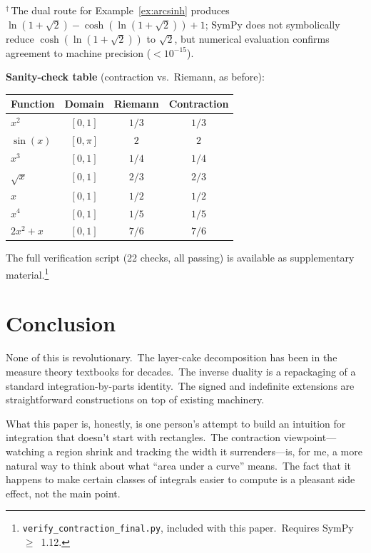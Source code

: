\documentclass[11pt,a4paper]{article}
\begin{document}
\noindent${}^{\dagger}$\,The dual route for Example~\ref{ex:arcsinh} produces $\ln(1{+}\sqrt{2}) - \cosh(\ln(1{+}\sqrt{2})) + 1$; SymPy does not symbolically reduce $\cosh(\ln(1{+}\sqrt{2}))$ to $\sqrt{2}$, but numerical evaluation confirms agreement to machine precision ($<10^{-15}$).

\medskip
\noindent\textbf{Sanity-check table} (contraction vs.\ Riemann, as before):

\begin{center}
\begin{tabular}{l c c c}
\textbf{Function} & \textbf{Domain} & \textbf{Riemann} & \textbf{Contraction} \\
\hline
$x^2$       & $[0,1]$   & $1/3$ & $1/3$ \\
$\sin(x)$   & $[0,\pi]$ & $2$   & $2$   \\
$x^3$       & $[0,1]$   & $1/4$ & $1/4$ \\
$\sqrt{x}$  & $[0,1]$   & $2/3$ & $2/3$ \\
$x$         & $[0,1]$   & $1/2$ & $1/2$ \\
$x^4$       & $[0,1]$   & $1/5$ & $1/5$ \\
$2x^2+x$    & $[0,1]$   & $7/6$ & $7/6$ \\
\end{tabular}
\end{center}

\noindent The full verification script (22 checks, all passing) is available as supplementary material.\footnote{\texttt{verify\_contraction\_final.py}, included with this paper.\ Requires SymPy $\geq$~1.12.}

\section{Conclusion}

None of this is revolutionary.\ The layer-cake decomposition has been in the measure theory textbooks for decades.\ The inverse duality is a repackaging of a standard integration-by-parts identity.\ The signed and indefinite extensions are straightforward constructions on top of existing machinery.

What this paper is, honestly, is one person's attempt to build an intuition for integration that doesn't start with rectangles.\ The contraction viewpoint---watching a region shrink and tracking the width it surrenders---is, for me, a more natural way to think about what ``area under a curve'' means.\ The fact that it happens to make certain classes of integrals easier to compute is a pleasant side effect, not the main point.
\end{document}
